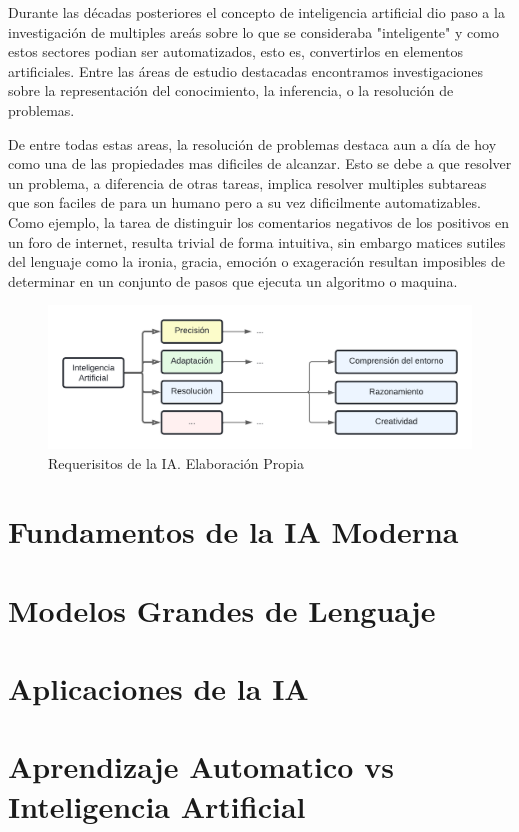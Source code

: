 Durante las décadas posteriores el concepto de inteligencia artificial dio paso a
la investigación de multiples areás sobre lo que se consideraba "inteligente" y como 
estos sectores podian ser automatizados, esto es, convertirlos en elementos artificiales.
Entre las áreas de estudio destacadas encontramos investigaciones sobre la representación
del conocimiento, la inferencia, o la resolución de problemas.

De entre todas estas areas, la resolución de problemas destaca aun a día de hoy
como una de las propiedades mas dificiles de alcanzar. Esto se debe a que
resolver un problema, a diferencia de otras tareas, implica resolver multiples
subtareas que son faciles de para un humano pero a su vez dificilmente
automatizables. Como ejemplo, la tarea de distinguir los comentarios negativos
de los positivos en un foro de internet, resulta trivial de forma intuitiva, sin
embargo matices sutiles del lenguaje como la ironia, gracia, emoción o
exageración resultan imposibles de determinar en un conjunto de pasos que
ejecuta un algoritmo o maquina.

\begin{figure}[!hbp]
    \centering
    \includegraphics[scale=0.3, trim=0.5cm 0.5cm 0.5cm 0.5cm]{figs/AI-properties.png}
    \caption{\small Requerisitos de la IA. Elaboración Propia}
    \label{fig:etiqueta}
\end{figure}

\section{Fundamentos de la IA Moderna}


\section{Modelos Grandes de Lenguaje}

\section{Aplicaciones de la IA}

\section{Aprendizaje Automatico vs Inteligencia Artificial}
